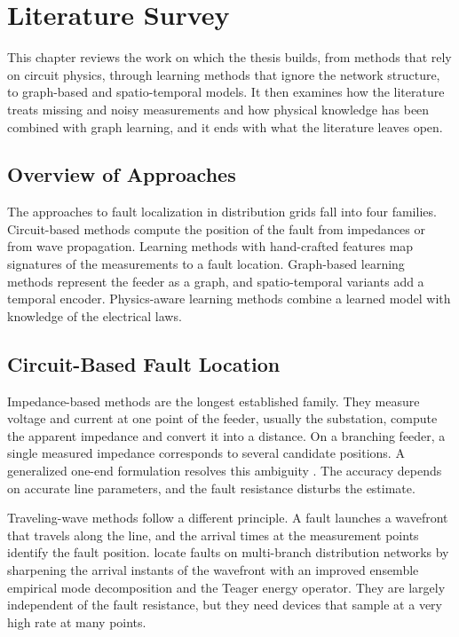 \documentclass[MTech]{ugthesis}
\begin{document}
\chapter{Literature Survey}
\label{chap:survey}

This chapter reviews the work on which the thesis builds, from methods that rely on circuit physics, through learning methods that ignore the network structure, to graph-based and spatio-temporal models. It then examines how the literature treats missing and noisy measurements and how physical knowledge has been combined with graph learning, and it ends with what the literature leaves open.

\section{Overview of Approaches}
\label{sec:overview}

The approaches to fault localization in distribution grids fall into four families. Circuit-based methods compute the position of the fault from impedances or from wave propagation. Learning methods with hand-crafted features map signatures of the measurements to a fault location. Graph-based learning methods represent the feeder as a graph, and spatio-temporal variants add a temporal encoder. Physics-aware learning methods combine a learned model with knowledge of the electrical laws.

\section{Circuit-Based Fault Location}

Impedance-based methods are the longest established family. They measure voltage and current at one point of the feeder, usually the substation, compute the apparent impedance and convert it into a distance. On a branching feeder, a single measured impedance corresponds to several candidate positions. A generalized one-end formulation resolves this ambiguity \citep{krishnathevar2012}. The accuracy depends on accurate line parameters, and the fault resistance disturbs the estimate.

Traveling-wave methods follow a different principle. A fault launches a wavefront that travels along the line, and the arrival times at the measurement points identify the fault position. \citet{liu2023} locate faults on multi-branch distribution networks by sharpening the arrival instants of the wavefront with an improved ensemble empirical mode decomposition and the Teager energy operator. They are largely independent of the fault resistance, but they need devices that sample at a very high rate at many points.
\end{document}
